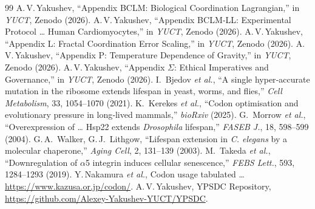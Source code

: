 \documentclass[12pt,a4paper]{article}
\begin{document}
	\begin{thebibliography}{99}
		 A.\,V.\,Yakushev, ``Appendix BCLM: Biological Coordination Lagrangian,'' in \emph{YUCT}, Zenodo (2026).
		 A.\,V.\,Yakushev, ``Appendix BCLM‑LL: Experimental Protocol … Human Cardiomyocytes,'' in \emph{YUCT}, Zenodo (2026).
		 A.\,V.\,Yakushev, ``Appendix L: Fractal Coordination Error Scaling,'' in \emph{YUCT}, Zenodo (2026).
		 A.\,V.\,Yakushev, ``Appendix P: Temperature Dependence of Gravity,'' in \emph{YUCT}, Zenodo (2026).
		 A.\,V.\,Yakushev, ``Appendix \(\Sigma\): Ethical Imperatives and Governance,'' in \emph{YUCT}, Zenodo (2026).
		 I.~Bjedov \emph{et al.}, ``A single hyper‑accurate mutation in the ribosome extends lifespan in yeast, worms, and flies,'' \emph{Cell Metabolism}, 33, 1054–1070 (2021).
		 K.~Kerekes \emph{et al.}, ``Codon optimisation and evolutionary pressure in long‑lived mammals,'' \emph{bioRxiv} (2025).
		 G.~Morrow \emph{et al.}, ``Overexpression of … Hsp22 extends \textit{Drosophila} lifespan,'' \emph{FASEB J.}, 18, 598–599 (2004).
		 G.\,A.~Walker, G.\,J.~Lithgow, ``Lifespan extension in \textit{C. elegans} by a molecular chaperone,'' \emph{Aging Cell}, 2, 131–139 (2003).
		 M.~Takeda \emph{et al.}, ``Downregulation of \(\alpha\)5 integrin induces cellular senescence,'' \emph{FEBS Lett.}, 593, 1284–1293 (2019).
		 Y.\,Nakamura \emph{et al.}, Codon usage tabulated … \url{https://www.kazusa.or.jp/codon/}.
		 A.\,V.\,Yakushev, YPSDC Repository, \url{https://github.com/Alexey-Yakushev-YUCT/YPSDC}.
	\end{thebibliography}
	
\end{document}
